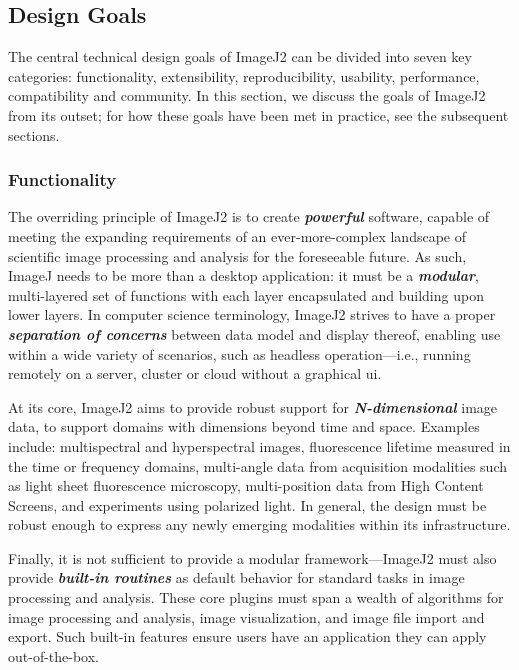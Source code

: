 \documentclass{bmcart}
\begin{document}

\subsection*{Design Goals}
The central technical design goals of ImageJ2 can be divided into seven key
categories: functionality, extensibility, reproducibility, usability,
performance, compatibility and community. In this section, we discuss the goals
of ImageJ2 from its outset; for how these goals have been met in practice, see
the subsequent sections.

\subsubsection*{Functionality}
The overriding principle of ImageJ2 is to create \textbf{\textit{powerful}}
software, capable of meeting the expanding requirements of an ever-more-complex
landscape of scientific image processing and analysis for the foreseeable
future. As such, ImageJ needs to be more than a desktop application: it must be
a
\textbf{\textit{modular}}, multi-layered set of functions with each layer
encapsulated and building upon lower layers. In computer science terminology,
ImageJ2 strives to have a proper \textbf{\textit{separation of concerns}}
between data model and display thereof, enabling use within a wide variety of
scenarios, such as headless operation---i.e., running remotely on a server,
cluster or cloud without a graphical \acrfull{ui}.

At its core, ImageJ2 aims to provide robust support for
\textbf{\textit{N-dimensional}} image data, to support domains with dimensions
beyond time and space. Examples include: multispectral and hyperspectral
images, fluorescence lifetime measured in the time or frequency domains,
multi-angle data from acquisition modalities such as light sheet fluorescence
microscopy, multi-position data from High Content Screens, and experiments
using polarized light. In general, the design must be robust enough to express
any newly emerging modalities within its infrastructure.

Finally, it is not sufficient to provide a modular framework---ImageJ2 must
also provide \textbf{\textit{built-in routines}} as default behavior for
standard tasks in image processing and analysis. These core plugins must span a
wealth of algorithms for image processing and analysis, image visualization,
and image file import and export. Such built-in features ensure users have an
application they can apply out-of-the-box.
\end{document}
